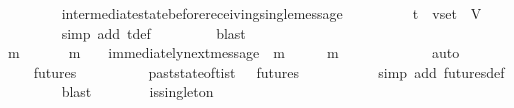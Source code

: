 \begin{isabellebody}
\ \ \ \ \ \ \ \isamarkupfalse%
\ intermediate{\isacharunderscore}state{\isacharunderscore}before{\isacharunderscore}receiving{\isacharunderscore}single{\isacharunderscore}message\ {\isacartoucheopen}{\isasymsigma}{\isacharprime}\ {\isasymin}\ {\isasymSigma}\ {\isasymand}\ {\isasymsigma}{\isacharprime}\ {\isasymnoteq}\ {\isasymemptyset}{\isacartoucheclose}\ {\isacartoucheopen}{\isasymsigma}\ {\isasymin}\ {\isasymSigma}t\ {\isasymand}\ v{\isacharunderscore}set\ {\isasymsubseteq}\ V{\isacartoucheclose}\isanewline
\ \ \ \ \ \ \ \isamarkupfalse%
\ {\isacharparenleft}simp\ add{\isacharcolon}\ {\isasymSigma}t{\isacharunderscore}def{\isacharparenright}\isanewline
\ \ \ \ \ \ \ \isamarkupfalse%
\ blast\ \ \ \ \ \ \ \ \ \isanewline
\ \ \ \ \ \isamarkupfalse%
\ \isamarkupfalse%
\ m\ {\isasymsigma}{\isacharprime}{\isacharprime}\ \ {\isachardoublequoteopen}{\isasymsigma}{\isacharprime}{\isacharprime}\ {\isasymin}\ {\isasymSigma}\ {\isasymand}\ m\ {\isasymin}\ {\isasymsigma}{\isacharprime}\ {\isasymand}\ immediately{\isacharunderscore}next{\isacharunderscore}message\ {\isacharparenleft}{\isasymsigma}{\isacharprime}{\isacharprime}{\isacharcomma}\ m{\isacharparenright}\ {\isasymand}\ {\isasymsigma}{\isacharprime}\ {\isacharequal}\ {\isasymsigma}{\isacharprime}{\isacharprime}\ {\isasymunion}\ {\isacharbraceleft}m{\isacharbraceright}\ {\isasymand}\ {\isasymsigma}\ {\isasymsubseteq}\ {\isasymsigma}{\isacharprime}{\isacharprime}{\isachardoublequoteclose}\isanewline
\ \ \ \ \ \ \ \isamarkupfalse%
\ auto\isanewline
\ \ \ \ \ \isamarkupfalse%
\ \isamarkupfalse%
\ {\isachardoublequoteopen}{\isasymsigma}{\isacharprime}{\isacharprime}\ {\isasymin}\ futures\ {\isasymsigma}{\isachardoublequoteclose}\isanewline
\ \ \ \ \ \ \ \isamarkupfalse%
\ past{\isacharunderscore}state{\isacharunderscore}of{\isacharunderscore}{\isasymSigma}t{\isacharunderscore}is{\isacharunderscore}{\isasymSigma}t\ {\isacartoucheopen}{\isasymsigma}{\isacharprime}\ {\isasymin}\ futures\ {\isasymsigma}{\isacartoucheclose}\ \isanewline
\ \ \ \ \ \ \ \isamarkupfalse%
\ {\isacharparenleft}simp\ add{\isacharcolon}\ futures{\isacharunderscore}def{\isacharparenright}\isanewline
\ \ \ \ \ \ \ \isamarkupfalse%
\ blast\ \isanewline
\ \ \ \ \ \isamarkupfalse%
\ {\isachardoublequoteopen}is{\isacharunderscore}singleton\ {\isacharparenleft}{\isasymsigma}{\isacharprime}\ {\isacharminus}\ {\isasymsigma}{\isacharprime}{\isacharprime}{\isacharparenright}{\isachardoublequoteclose}\ \isanewline

\end{isabellebody}
